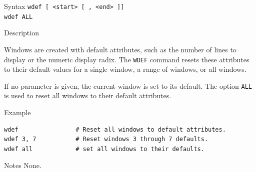 %
%
\pagebreak
{}

\begin{iPageDescEntry}{Syntax}
\texttt{wdef [ <start> [ , <end> ]] } \\
\texttt{wdef ALL} \\
\end{iPageDescEntry}

\begin{iPageDescEntry}{Description}

Windows are created with default attributes, such as the number of lines to display or the numeric display radix. The \texttt{WDEF} command resets these attributes to their default values for a single window, a range of windows, or all windows. 

If no parameter is given, the current window is set to its default. The option \texttt{ALL} is used to reset all windows to their default attributes.

\end{iPageDescEntry}

\begin{iPageDescOpEntry}{Example}
\begin{lstlisting}[style=iPageOpStyle]
wdef                # Reset all windows to default attributes.
wdef 3, 7           # Reset windows 3 through 7 defaults.
wdef all			# set all windows to their defaults.
\end{lstlisting}
\end{iPageDescOpEntry}

\begin{iPageDescEntry}{Notes}
None.
\end{iPageDescEntry}
